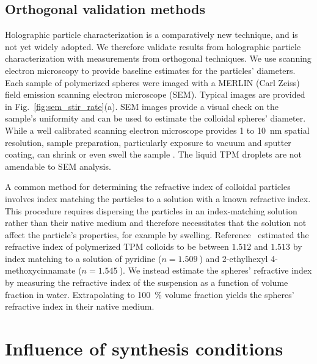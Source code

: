\subsection{Orthogonal validation methods}

Holographic particle characterization is a comparatively new technique,
and is not yet widely adopted. We therefore validate results from
holographic particle characterization with measurements from orthogonal
techniques.
We use scanning electron microscopy to provide baseline estimates for the
particles' diameters.
Each sample of polymerized spheres were imaged with a MERLIN (Carl Zeiss) field
emission scanning electron microscope (SEM).
Typical images are provided in Fig.~\ref{fig:sem_stir_rate}(a).
SEM images provide a visual check on the sample's uniformity
and can be used to estimate the colloidal spheres' diameter. While a well calibrated scanning
electron microscope provides \num{1} to \SI{10}{\nm} spatial resolution, sample
preparation, particularly exposure to vacuum and sputter coating, can shrink or
even swell the sample \cite{yamada85,jung02}. The liquid TPM droplets
are not amendable to SEM analysis.

A common method for determining the refractive index of colloidal particles
involves index matching the particles to a solution with a known refractive index.
This procedure requires dispersing the particles in an index-matching solution
rather than their native medium and therefore necessitates
that the solution not affect the particle's properties, for
example by swelling.  Reference~\cite{vanderwel17} estimated the
refractive index of polymerized TPM colloids to be between $\num{1.512}$ and $\num{1.513}$
by index matching to a solution of pyridine ($n = \SI{1.509}{}$) and \num{2}-ethylhexyl
\num{4}-methoxycinnamate ($n = \SI{1.545}{}$). We instead estimate the spheres'
refractive index by measuring the refractive index of the suspension as a function of
volume fraction in water. Extrapolating  to \SI{100}{\percent} volume fraction
yields the spheres' refractive index \cite{alexander81} in their native medium.

\section{Influence of synthesis conditions}
